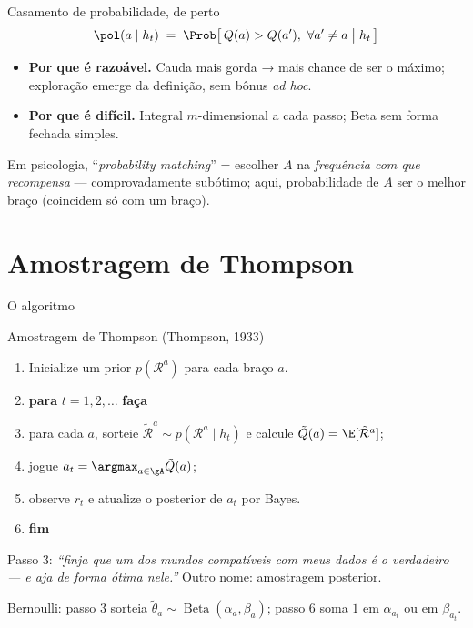 \documentclass[aspectratio=169, 11pt]{beamer}
\newcommand{\Bdist}{\operatorname{Beta}}
\newcommand{\hist}{h_t}
\begin{document}
\begin{frame}{Casamento de probabilidade, de perto}
  \[
    \pol(a \mid \hist)
    \;=\; \Prob\big[\,Q(a) > Q(a'),\ \forall a' \neq a \;\big|\; \hist \,\big]
  \]

  \begin{itemize}
    \item \textbf{Por que é razoável.} Cauda mais gorda → mais chance de
          ser o máximo; exploração emerge da definição, sem bônus
          \emph{ad hoc}.
    \item \textbf{Por que é difícil.} Integral $m$-dimensional a cada
          passo; Beta sem forma fechada simples.
  \end{itemize}

  \begin{alertabox}
    Em psicologia, ``\emph{probability matching}'' = escolher $A$ na
    \emph{frequência com que recompensa} — comprovadamente subótimo; aqui,
    probabilidade de $A$ ser o \alert{melhor braço} (coincidem só com um
    braço).
  \end{alertabox}
\end{frame}

\section{Amostragem de Thompson}

\begin{frame}{O algoritmo}
  \begin{algbox}{Amostragem de Thompson (Thompson, 1933)}
    \begin{enumerate}\setlength{\itemsep}{0.15ex}
      \item Inicialize um prior $p(\mathcal{R}^a)$ para cada braço $a$.
      \item \textbf{para} $t = 1, 2, \ldots$ \textbf{faça}
      \item \quad para cada $a$, \alert{sorteie}
            $\tilde{\mathcal{R}}^a \sim p(\mathcal{R}^a \mid \hist)$
            e calcule $\tilde{Q}(a) = \E[\tilde{\mathcal{R}}^a]$;
      \item \quad jogue $a_t = \argmax_{a \in \gA} \tilde{Q}(a)$;
      \item \quad observe $r_t$ e atualize o posterior de $a_t$ por Bayes.
      \item \textbf{fim}
    \end{enumerate}
  \end{algbox}

  \begin{ideiabox}
    Passo 3: \emph{``finja que um dos mundos compatíveis com meus dados é
    o verdadeiro — e aja de forma ótima nele.''} Outro nome:
    \alert{amostragem posterior}.
  \end{ideiabox}

  \smallskip
  {\small\color{rlCinza} Bernoulli: passo 3 sorteia
  $\tilde\theta_a \sim \Bdist(\alpha_a, \beta_a)$; passo 6 soma $1$ em
  $\alpha_{a_t}$ ou em $\beta_{a_t}$.}
\end{frame}
\end{document}
